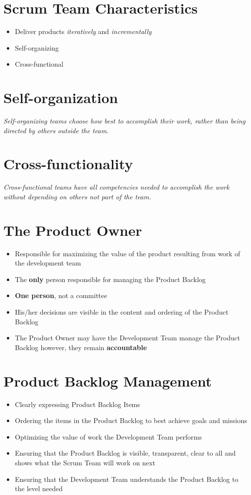 \documentclass[a4paper,11pt,twocolumn]{article}
\begin{document}
\section*{Scrum Team Characteristics}
\begin{itemize}
	\item Deliver products \textit{iteratively} and \textit{incrementally}
	\item Self-organizing
	\item Cross-functional
\end{itemize}

\section*{Self-organization}
\textit{Self-organizing teams choose how best to accomplish their work, rather than being directed by others outside the team.}

\section*{Cross-functionality}
\textit{Cross-functional teams have all competencies needed to accomplish the work without depending on others not part of the team.}

\section*{The Product Owner}
\begin{itemize}
    \item Responsible for maximizing the value of the product resulting from work of the development team
    \item The \textbf{only} person responsible for managing the Product Backlog
	\item \textbf{One person}, not a committee
	\item His/her decisions are visible in the content and ordering of the Product Backlog
	\item The Product Owner may have the Development Team manage the Product Backlog however, they remain \textbf{accountable}
\end{itemize}

\section*{Product Backlog Management}
\begin{itemize}
    \item Clearly expressing Product Backlog Items
    \item Ordering the items in the Product Backlog to best achieve goals and missions
    \item Optimizing the value of work the Development Team performs
    \item Ensuring that the Product Backlog is visible, transparent, clear to all and shows what the Scrum Team will work on next
    \item Ensuring that the Development Team understands the Product Backlog to the level needed
\end{itemize}
\end{document}
